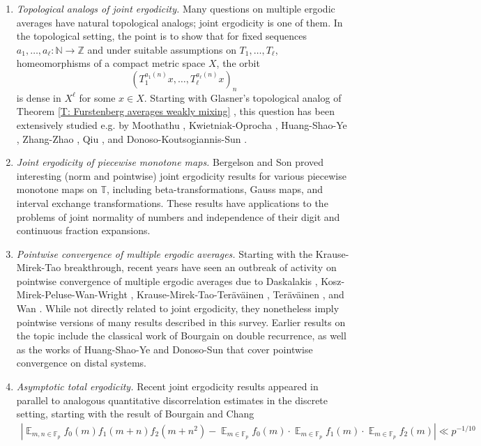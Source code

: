 \documentclass[11pt]{amsart}
\theoremstyle{definition}
\DeclareMathOperator*{\E}{\mathbb{E}}
\newcommand{\F}{{\mathbb F}}
\newcommand{\N}{{\mathbb N}}
\newcommand{\T}{{\mathbb T}}
\newcommand{\Z}{{\mathbb Z}}
\newcommand{\1}{{\mathbf{1}}}
\newcommand{\abs}[1]{\mathopen{}\left| #1\mathclose{}\right|}
\begin{document}
\begin{enumerate}
    \item \emph{Topological analogs of joint ergodicity.} Many questions on multiple ergodic averages have natural topological analogs; joint ergodicity is one of them. In the topological setting, the point is to show that for fixed sequences $a_1, \ldots, a_\ell:\N\to\Z$ and under suitable assumptions on $T_1, \ldots, T_\ell$, homeomorphisms of a compact metric space $X$, the orbit $$(T_1^{a_1(n)}x, \ldots, T_\ell^{a_\ell(n)}x)_n$$ is dense in $X^\ell$ for some $x\in X$. Starting with Glasner's topological analog of Theorem \ref{T: Furstenberg averages weakly mixing} \cite{Gl94}, this question has been extensively studied e.g. by Moothathu \cite{Mo10}, Kwietniak-Oprocha \cite{KwOp12}, Huang-Shao-Ye \cite{HSY19}, Zhang-Zhao \cite{ZhZh21}, Qiu \cite{Qiu23}, and Donoso-Koutsogiannis-Sun \cite{DKS24}. 
    \item \emph{Joint ergodicity of piecewise monotone maps.} Bergelson and Son \cite{BS23, BS22} proved interesting (norm and pointwise) joint ergodicity results for various piecewise monotone maps on $\T$, including beta-transformations, Gauss maps, and interval exchange transformations. These results have applications to the problems of joint normality of numbers and independence of their digit and continuous fraction expansions. 
    \item \emph{Pointwise convergence of multiple ergodic averages.} Starting with the Krause-Mirek-Tao \cite{KMT20} breakthrough, recent years have seen an outbreak of activity on pointwise convergence of multiple ergodic averages due to Daskalakis \cite{Das25b}, Kosz-Mirek-Peluse-Wan-Wright \cite{KMPWW24}, Krause-Mirek-Tao-Ter\"av\"ainen \cite{KMTT24}, Ter\"av\"ainen \cite{Ter24}, and Wan \cite{Wan25}. While not directly related to joint ergodicity, they nonetheless imply pointwise versions of many results described in this survey. Earlier results on the topic include the classical work of Bourgain \cite{Bo90} on double recurrence, as well as the works of Huang-Shao-Ye \cite{HSY19b} and Donoso-Sun \cite{DS21} that cover pointwise convergence on distal systems.   
    \item \emph{Asymptotic total ergodicity.} Recent joint ergodicity results appeared in parallel to analogous quantitative discorrelation estimates in the discrete setting, starting with the result of Bourgain and Chang \cite{BC17}
    \begin{align*}
        \abs{\E_{m,n\in\F_p}f_0(m)f_1(m+n)f_2(m+n^2) - \E_{m\in\F_p}f_0(m)\cdot \E_{m\in\F_p}f_1(m)\cdot \E_{m\in\F_p}f_2(m)}\ll p^{-1/10}

\end{align*}
\end{enumerate}
\end{document}
